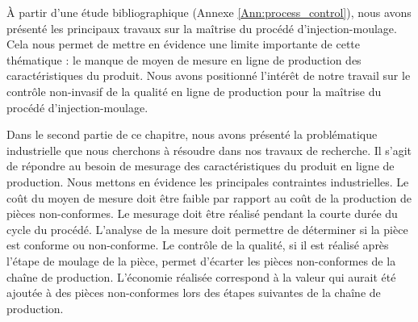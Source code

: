

À partir d'une étude bibliographique (Annexe \ref{Ann:process_control}), nous avons présenté les principaux travaux sur la maîtrise du procédé d'injection-moulage.
Cela nous permet de mettre en évidence une limite importante de cette thématique : le manque de moyen de mesure en ligne de production des caractéristiques du produit.
Nous avons positionné l'intérêt de notre travail sur le contrôle non-invasif de la qualité en ligne de production pour la maîtrise du procédé d'injection-moulage.

\smallskip

Dans le second partie de ce chapitre, nous avons présenté la problématique industrielle que nous cherchons à résoudre dans nos travaux de recherche.
Il s'agit de répondre au besoin de mesurage des caractéristiques du produit en ligne de production.
Nous mettons en évidence les principales contraintes industrielles.
Le coût du moyen de mesure doit être faible par rapport au coût de la production de pièces non-conformes.
Le mesurage doit être réalisé pendant la courte durée du cycle du procédé.
L'analyse de la mesure doit permettre de déterminer si la pièce est conforme ou non-conforme.
Le contrôle de la qualité, si il est réalisé après l'étape de moulage de la pièce, permet d'écarter les pièces non-conformes de la chaîne de production.
L'économie réalisée correspond à la valeur qui aurait été ajoutée à des pièces non-conformes lors des étapes suivantes de la chaîne de production.

